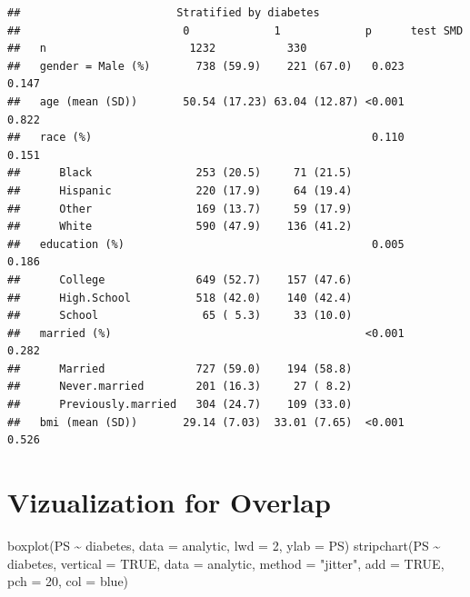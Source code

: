 \documentclass[
]{book}
\newenvironment{Shaded}{\begin{snugshade}}{\end{snugshade}}
\newcommand{\AttributeTok}[1]{\textcolor[rgb]{0.77,0.63,0.00}{#1}}
\newcommand{\ConstantTok}[1]{\textcolor[rgb]{0.00,0.00,0.00}{#1}}
\newcommand{\DecValTok}[1]{\textcolor[rgb]{0.00,0.00,0.81}{#1}}
\newcommand{\FunctionTok}[1]{\textcolor[rgb]{0.00,0.00,0.00}{#1}}
\newcommand{\NormalTok}[1]{#1}
\newcommand{\SpecialCharTok}[1]{\textcolor[rgb]{0.00,0.00,0.00}{#1}}
\newcommand{\StringTok}[1]{\textcolor[rgb]{0.31,0.60,0.02}{#1}}
\begin{document}
\begin{verbatim}
##                        Stratified by diabetes
##                         0             1             p      test SMD   
##   n                      1232           330                           
##   gender = Male (%)       738 (59.9)    221 (67.0)   0.023       0.147
##   age (mean (SD))       50.54 (17.23) 63.04 (12.87) <0.001       0.822
##   race (%)                                           0.110       0.151
##      Black                253 (20.5)     71 (21.5)                    
##      Hispanic             220 (17.9)     64 (19.4)                    
##      Other                169 (13.7)     59 (17.9)                    
##      White                590 (47.9)    136 (41.2)                    
##   education (%)                                      0.005       0.186
##      College              649 (52.7)    157 (47.6)                    
##      High.School          518 (42.0)    140 (42.4)                    
##      School                65 ( 5.3)     33 (10.0)                    
##   married (%)                                       <0.001       0.282
##      Married              727 (59.0)    194 (58.8)                    
##      Never.married        201 (16.3)     27 ( 8.2)                    
##      Previously.married   304 (24.7)    109 (33.0)                    
##   bmi (mean (SD))       29.14 (7.03)  33.01 (7.65)  <0.001       0.526
\end{verbatim}

\hypertarget{vizualization-for-overlap}{%
\section{Vizualization for Overlap}\label{vizualization-for-overlap}}

\begin{Shaded}
\begin{Highlighting}[]
\FunctionTok{boxplot}\NormalTok{(PS }\SpecialCharTok{\textasciitilde{}}\NormalTok{ diabetes, }\AttributeTok{data =}\NormalTok{ analytic, }
        \AttributeTok{lwd =} \DecValTok{2}\NormalTok{, }\AttributeTok{ylab =} \StringTok{\textquotesingle{}PS\textquotesingle{}}\NormalTok{)}
\FunctionTok{stripchart}\NormalTok{(PS }\SpecialCharTok{\textasciitilde{}}\NormalTok{ diabetes, }\AttributeTok{vertical =} \ConstantTok{TRUE}\NormalTok{, }
           \AttributeTok{data =}\NormalTok{ analytic, }\AttributeTok{method =} \StringTok{"jitter"}\NormalTok{, }
           \AttributeTok{add =} \ConstantTok{TRUE}\NormalTok{, }\AttributeTok{pch =} \DecValTok{20}\NormalTok{, }\AttributeTok{col =} \StringTok{\textquotesingle{}blue\textquotesingle{}}\NormalTok{)}
\end{Highlighting}
\end{Shaded}
\end{document}
